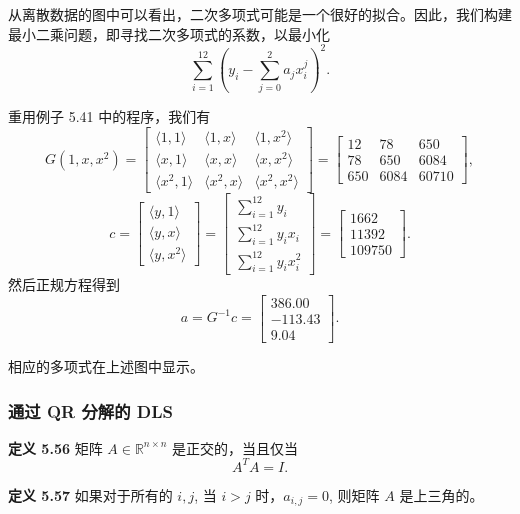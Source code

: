 \documentclass[a4paper]{ctexart}
\begin{document}
{从离散数据的图中可以看出，二次多项式可能是一个很好的拟合。因此，我们构建最小二乘问题，即寻找二次多项式的系数，以最小化
\[ 
  \sum_{i=1}^{12} \left(y_i - \sum_{j=0}^2 a_j x_i^j\right)^2. 
\]

重用例子 5.41 中的程序，我们有
\[ 
G(1, x, x^2) 
  = \begin{bmatrix} 
      \langle 1,1 \rangle & \langle 1,x \rangle & \langle 1,x^2 \rangle \\ 
      \langle x,1 \rangle & \langle x,x \rangle & \langle x,x^2 \rangle \\ 
      \langle x^2,1 \rangle & \langle x^2,x \rangle & \langle x^2,x^2 \rangle 
    \end{bmatrix} = \begin{bmatrix} 12 & 78 & 650 \\ 78 & 650 & 6084 \\ 650 & 6084 & 60710 \end{bmatrix}, 
\]
\[ 
  c 
    = \begin{bmatrix} 
        \langle y, 1 \rangle \\ 
        \langle y, x \rangle \\ 
        \langle y, x^2 \rangle 
      \end{bmatrix} 
    = \begin{bmatrix} 
        \sum_{i=1}^{12} y_i \\ 
        \sum_{i=1}^{12} y_i x_i \\ 
        \sum_{i=1}^{12} y_i x_i^2 
      \end{bmatrix} 
    = \begin{bmatrix} 1662 \\ 11392 \\ 109750 \end{bmatrix}. 
\]
然后正规方程得到
\[ 
  a = G^{-1}c = \begin{bmatrix} 386.00 \\ -113.43 \\ 9.04 \end{bmatrix}. 
\]

相应的多项式在上述图中显示。

\subsubsection{通过 QR 分解的 DLS}

\noindent \textbf{定义 5.56 } 矩阵 $A \in \mathbb{R}^{n \times n}$ 是正交的，当且仅当
\[ 
  A^T A = I. 
\]

\noindent \textbf{定义 5.57 } 如果对于所有的 $i, j$, 当 $i > j$ 时，$a_{i, j} = 0$, 则矩阵 $A$ 是上三角的。

}
\end{document}
